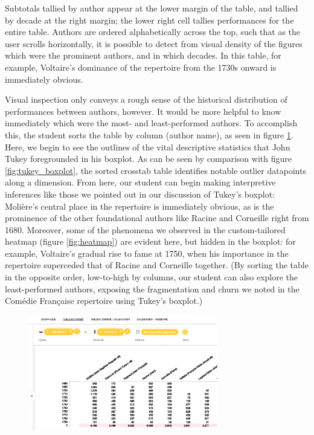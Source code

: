 \documentclass[	DIV=calc,%
							paper=a4,%
							fontsize=11pt,%
							twocolumn]{scrartcl}	 					%
\begin{document}
Subtotals tallied by author appear at the lower margin of the table, and tallied by decade at the right margin; the lower right cell tallies performances for the entire table.  Authors are ordered alphabetically across the top, such that as the user scrolls horizontally, it is possible to detect from visual density of the figures which were the prominent authors, and in which decades.  In this table, for example, Voltaire’s dominance of the repertoire from the 1730s onward is immediately obvious.

Visual inspection only conveys a rough sense of the historical distribution of performances between authors, however.  It would be more helpful to know immediately which were the most- and least-performed authors.  To accomplish this, the student sorts the table by column (author name), as seen in figure \ref{fig:sorted}.  Here, we begin to see the outlines of the vital descriptive statistics that John Tukey foregrounded in his boxplot.  As can be seen by comparison with figure \ref{fig:tukey_boxplot}, the sorted crosstab table identifies notable outlier datapoints along a dimension.  From here, our student can begin making interpretive inferences like those we pointed out in our discussion of Tukey’s boxplot: Molière’s central place in the repertoire is immediately obvious, as is the prominence of the other foundational authors like Racine and Corneille right from 1680.  Moreover, some of the phenomena we observed in the custom-tailored heatmap (figure \ref{fig:heatmap}) are evident here, but hidden in the boxplot: for example, Voltaire’s gradual rise to fame at 1750, when his importance in the repertoire superceded that of Racine and Corneille together.  (By sorting the table in the opposite order, low-to-high by columns, our student can also explore the least-performed authors, exposing  the fragmentation and churn we noted in the Comédie Française repertoire using Tukey’s boxplot.)

\begin{figure}
  \centering
	\includegraphics[width=3.25in]{steps/sorted.png}
	\caption{}
	\label{fig:sorted}
\end{figure}
\end{document}
